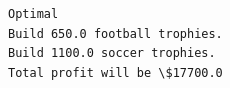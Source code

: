 \documentclass[11pt]{article}
\begin{document}
    \begin{Verbatim}[commandchars=\\\{\}]
Optimal
Build 650.0 football trophies.
Build 1100.0 soccer trophies.
Total profit will be \$17700.0

    \end{Verbatim}


    
    
    
    
\end{document}
